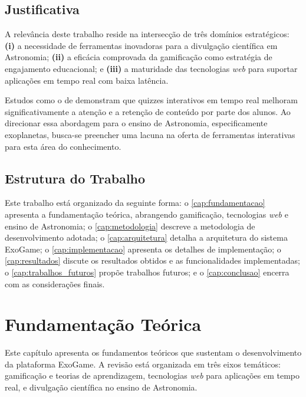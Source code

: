 \documentclass[
	12pt,
	openany,
	oneside,
	a4paper,
	english,
	brazil
]{abntex2}
\begin{document}
\section{Justificativa}

A relevância deste trabalho reside na intersecção de três domínios estratégicos: \textbf{(i)} a necessidade de ferramentas inovadoras para a divulgação científica em Astronomia; \textbf{(ii)} a eficácia comprovada da gamificação como estratégia de engajamento educacional; e \textbf{(iii)} a maturidade das tecnologias \textit{web} para suportar aplicações em tempo real com baixa latência.

Estudos como o de  demonstram que quizzes interativos em tempo real melhoram significativamente a atenção e a retenção de conteúdo por parte dos alunos. Ao direcionar essa abordagem para o ensino de Astronomia, especificamente exoplanetas, busca-se preencher uma lacuna na oferta de ferramentas interativas para esta área do conhecimento.

\section{Estrutura do Trabalho}

Este trabalho está organizado da seguinte forma: o \autoref{cap:fundamentacao} apresenta a fundamentação teórica, abrangendo gamificação, tecnologias \textit{web} e ensino de Astronomia; o \autoref{cap:metodologia} descreve a metodologia de desenvolvimento adotada; o \autoref{cap:arquitetura} detalha a arquitetura do sistema ExoGame; o \autoref{cap:implementacao} apresenta os detalhes de implementação; o \autoref{cap:resultados} discute os resultados obtidos e as funcionalidades implementadas; o \autoref{cap:trabalhos_futuros} propõe trabalhos futuros; e o \autoref{cap:conclusao} encerra com as considerações finais.


\chapter{Fundamentação Teórica}\label{cap:fundamentacao}

Este capítulo apresenta os fundamentos teóricos que sustentam o desenvolvimento da plataforma ExoGame. A revisão está organizada em três eixos temáticos: gamificação e teorias de aprendizagem, tecnologias \textit{web} para aplicações em tempo real, e divulgação científica no ensino de Astronomia.
\end{document}
